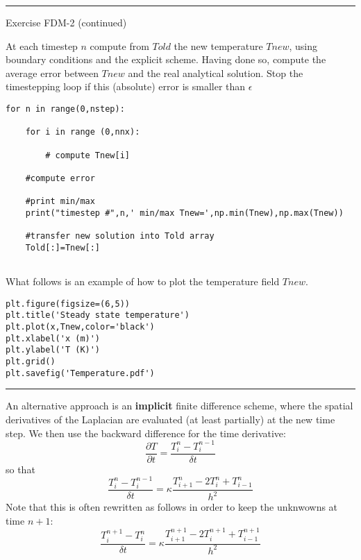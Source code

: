 \begin{center}
\begin{minipage}[t]{0.77\textwidth}
\par\noindent\rule{\textwidth}{0.4pt}

\begin{center}
{\color{orange}Exercise FDM-2 (continued)}
\end{center}

At each timestep $n$ compute from $Told$ the new temperature $Tnew$, using boundary conditions and the explicit scheme. Having done so, compute the average error between $Tnew$ and the real analytical solution. Stop the timestepping loop if this (absolute) error is smaller than $\epsilon$

\begin{verbatim}
for n in range(0,nstep):

    for i in range (0,nnx):

        # compute Tnew[i]

    #compute error
    
    #print min/max
    print("timestep #",n,' min/max Tnew=',np.min(Tnew),np.max(Tnew))        

    #transfer new solution into Told array
    Told[:]=Tnew[:]
    
\end{verbatim}

What follows is an example of how to plot the temperature field $Tnew$.

\begin{verbatim}
plt.figure(figsize=(6,5)) 
plt.title('Steady state temperature')
plt.plot(x,Tnew,color='black')
plt.xlabel('x (m)')
plt.ylabel('T (K)')
plt.grid()
plt.savefig('Temperature.pdf')
\end{verbatim}


\par\noindent\rule{\textwidth}{0.4pt}
\end{minipage}
\end{center}

\noindent An alternative approach is an {\bf implicit} finite difference scheme, where the spatial derivatives
of the Laplacian are evaluated (at least partially) at the new time step.
We then use the backward difference for the time derivative:
\begin{equation}
\frac{\partial T}{\partial t} = \frac{T_{i}^{n}-T_i^{n-1}}{\delta t} 
\end{equation}
so that
\begin{equation}
\frac{T_{i}^{n}-T_i^{n-1}}{\delta t} = \kappa \frac{T_{i+1}^n - 2T_i^n + T_{i-1}^n}{h^2}
\end{equation}
Note that this is often rewritten as follows in order to keep the unknwowns at time $n+1$:
\begin{equation}
\frac{T_{i}^{n+1}-T_i^{n}}{\delta t} = \kappa \frac{T_{i+1}^{n+1} - 2T_i^{n+1} + T_{i-1}^{n+1}}{h^2}
\end{equation}

